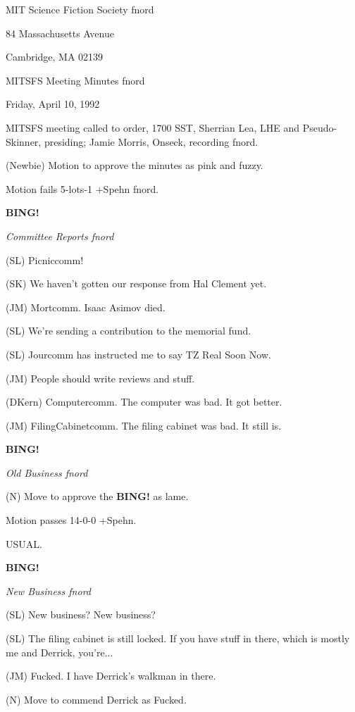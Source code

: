 \documentclass[12pt]{article}
\newcommand{\bing}{{\bf BING!} }
\newcommand{\goto}[1]{\bing \vskip 12pt \centerline{{\em{#1}}}}
\begin{document}
\begin{center}

MIT Science Fiction Society fnord

84 Massachusetts Avenue

Cambridge, MA 02139

\vspace{12pt}

MITSFS Meeting Minutes fnord

Friday, April 10, 1992

\end{center}
 
\vspace{18pt}

\setlength{\parskip}{6pt}

\noindent
MITSFS meeting called to order, 1700 SST,
Sherrian Lea, LHE and Pseudo-Skinner, presiding; Jamie Morris, Onseck, recording fnord.

(Newbie) Motion to approve the minutes as pink and fuzzy.

Motion fails 5-lots-1 +Spehn fnord.

\goto{Committee Reports fnord}

(SL) Picniccomm!

(SK) We haven't gotten our response from Hal Clement yet.

(JM) Mortcomm. Isaac Asimov died.

(SL) We're sending a contribution to the memorial fund.

(SL) Jourcomm has instructed me to say TZ Real Soon Now.

(JM) People should write reviews and stuff.

(DKern) Computercomm. The computer was bad. It got better.

(JM) FilingCabinetcomm. The filing cabinet was bad. It still is.

\goto{Old Business fnord}

(N) Move to approve the \bing as lame.

Motion passes 14-0-0 +Spehn.

USUAL.

\goto{New Business fnord}

(SL) New business? New business?

(SL) The filing cabinet is still locked. If you have stuff in there, which is mostly me and Derrick, you're...

(JM) Fucked. I have Derrick's walkman in there.

(N) Move to commend Derrick as Fucked.
\end{document}

